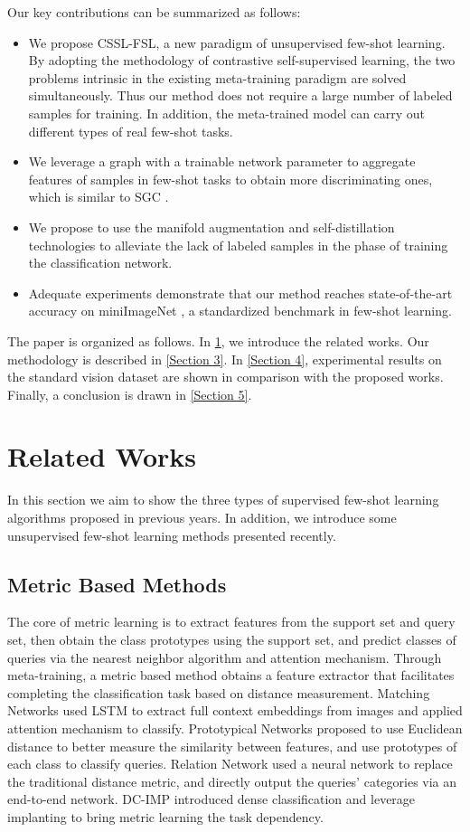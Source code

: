 \documentclass[conference]{IEEEtran}
\begin{document}
Our key contributions can be summarized as follows:
\begin{itemize}
\item We propose CSSL-FSL, a new paradigm of unsupervised few-shot learning. By adopting the methodology of contrastive self-supervised learning, the two problems intrinsic in the existing meta-training paradigm are solved simultaneously. Thus our method does not require a large number of labeled samples for training. In addition, the meta-trained model can carry out different types of real few-shot tasks.
\item We leverage a graph with a trainable network parameter to aggregate features of samples in few-shot tasks to obtain more discriminating ones, which is similar to SGC \cite{wu2019simplifying}.
\item We propose to use the manifold augmentation and self-distillation technologies to alleviate the lack of labeled samples in the phase of training the classification network.
\item Adequate experiments demonstrate that our method reaches state-of-the-art accuracy on miniImageNet , a standardized benchmark in few-shot learning.
\end{itemize}


The paper is organized as follows. In \ref{Section 2}, we introduce the related works. Our methodology is described in \ref{Section 3}. In \ref{Section 4}, experimental results on the standard vision dataset are shown in comparison with the proposed works. Finally, a conclusion is drawn in \ref{Section 5}.


\section{Related Works}\label{Section 2}
In this section we aim to show the three types of supervised few-shot learning algorithms proposed in previous years. In addition, we introduce some unsupervised few-shot learning methods presented recently.

\subsection{Metric Based Methods}
The core of metric learning is to extract features from the support set and query set, then obtain the class prototypes using the support set, and predict classes of queries via the nearest neighbor algorithm and attention mechanism. Through meta-training, a metric based method obtains a feature extractor that facilitates completing the classification task based on distance measurement. Matching Networks \cite{vinyals2016matching} used LSTM to extract full context embeddings from images and applied attention mechanism to classify. Prototypical Networks \cite{snell2017prototypical} proposed to use Euclidean distance to better measure the similarity between features, and use prototypes of each class to classify queries. Relation Network \cite{sung2018learning} used a neural network to replace the traditional distance metric, and directly output the queries’ categories via an end-to-end network. DC-IMP \cite{lifchitz2019dense} introduced dense classification and leverage implanting to bring metric learning the task dependency.
\end{document}
